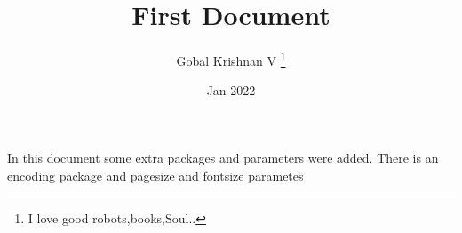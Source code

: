 \documentclass[12pt, letterpaper,twoside]{article}
\title{First Document}
\author{Gobal Krishnan V \thanks{I love good robots,books,Soul..}}
\date{Jan 2022}
\begin{document}
 \begin{titlepage}
   \maketitle
 \end{titlepage}
 
 In this document some extra packages and parameters were added. There is an encoding package and pagesize and fontsize parametes
 
 
 
\end{document}
